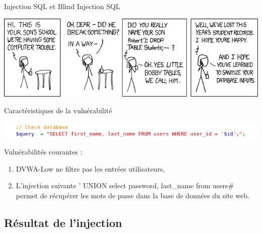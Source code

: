 \documentclass[8pt]{beamer}
\begin{document}
\begin{frame}{Injection SQL et Blind Injection SQL }
\begin{center}
	\includegraphics[scale=.5]{../images/bd.png}
\end{center}


\begin{block}{Caractéristiques de la vulnérabilité}
	\begin{center}
		\includegraphics[scale=.5]{../images/sql/code_low.png}
	\end{center}
	Vulnérabilités courantes :
	\begin{enumerate}[\ding{217}]
		\item DVWA-Low ne filtre pas les entrées utilisateurs,
		\item L'injection suivante {\color{red} ' UNION select password, last\_name from users\#} permet de récupérer les mots de passe dans la base de données du site web.

	\end{enumerate}
\end{block}

\end{frame}


\subsection{Résultat de l'injection}
\end{document}
